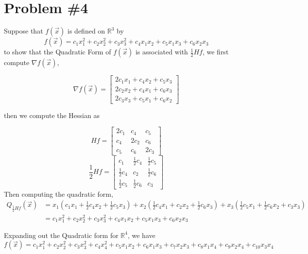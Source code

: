 \documentclass{article}
\newcommand{\RR}{\mathbb{R}}
\begin{document}
\section*{Problem \#4}
Suppose that $f(\vec{x})$ is defined on $\RR^3$ by
\begin{equation*}
    f(\vec{x}) = c_1x_1^2 + c_2x_2^2 + c_3x_3^2 + c_4x_1x_2 + c_5x_1x_3 + c_6x_2x_3
\end{equation*}
to show that the Quadratic Form of $f(\vec{x})$ is associated with $\frac{1}{2}Hf$, we first compute $\nabla f(\vec{x})$,

\begin{equation*}
    \nabla f(\vec{x}) = \begin{bmatrix*}
        2c_1x_1 +c_4x_2 + c_5x_3 \\
        2c_2x_2 + c_4x_1 + c_6x_3 \\
        2c_3x_3 + c_5x_1 + c_6x_2
    \end{bmatrix*}
\end{equation*}

then we compute the Hessian as

\begin{equation*}
    Hf = \begin{bmatrix*}
        2c_1 & c_4 & c_5 \\
        c_4 & 2c_2 & c_6 \\
        c_5 & c_6 & 2c_3
    \end{bmatrix*}
\end{equation*}
\begin{equation*}
 \frac{1}{2} Hf = \begin{bmatrix*}
        c_1 & \frac{1}{2}c_4 & \frac{1}{2}c_5 \\
        \frac{1}{2}c_4 & c_2 & \frac{1}{2}c_6 \\
        \frac{1}{2}c_5 & \frac{1}{2}c_6 & c_3
    \end{bmatrix*}
\end{equation*}
Then computing the quadratic form,
\begin{align*}
    Q_{\frac{1}{2}Hf}(\vec{x}) &= x_1(c_1x_1 + \frac{1}{2}c_4x_2 + \frac{1}{2}c_5x_3) + x_2(\frac{1}{2}c_4x_1 + c_2x_2 +  \frac{1}{2}c_6x_3) + x_3(\frac{1}{2}c_5x_1 + \frac{1}{2}c_6x_2 + c_3x_3) \\
    &= c_1x_1^2 + c_2x_2^2 + c_3x_3^2 + c_4x_1x_2 + c_5x_1x_3 + c_6x_2x_3
\end{align*}

Expanding out the Quadratic form for $\RR^4$, we have
\begin{equation*}
     f(\vec{x}) = c_1x_1^2 + c_2x_2^2 + c_3x_3^2 + c_4x_4^2 + c_5x_1x_2 + c_6x_1x_3 + c_7x_2x_3 + c_8x_1x_4 + c_9x_2x_4 + c_{10}x_3x_4
\end{equation*}
\end{document}
